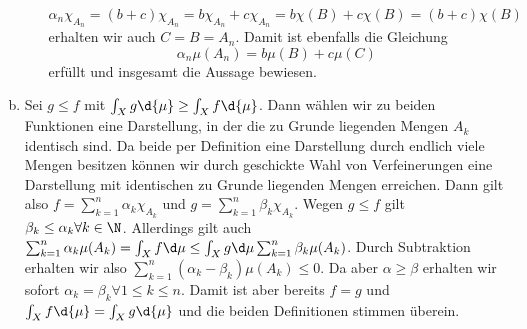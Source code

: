\documentclass{article}
\begin{document}
\begin{enumerate}[(a)]
\begin{enumerate}[1.]
            \[
                \alpha_n\chi_{A_n} = (b + c) \chi_{A_n} = b \chi_{A_n} + c \chi_{A_n} = b \chi(B) + c \chi(B) = (b + c) \chi(B)
            \]
            erhalten wir auch $C = B = A_n$. Damit ist ebenfalls die Gleichung
            \[
                \alpha_n \mu(A_n) = b\mu(B) + c\mu(C)  
            \]
            erfüllt und insgesamt die Aussage bewiesen.
        \end{enumerate}
        \item Sei $g \leq f$ mit $\int_X g \d{\mu} \geq \int_X f \d{\mu}$. Dann wählen wir zu beiden Funktionen eine Darstellung, in der die zu Grunde liegenden Mengen $A_k$ identisch sind. Da beide per Definition eine Darstellung durch endlich viele Mengen besitzen können wir durch geschickte Wahl von Verfeinerungen eine Darstellung mit identischen zu Grunde liegenden Mengen erreichen. Dann gilt also $f = \sum_{k = 1}^{n} \alpha_k \chi_{A_k}$ und $g = \sum_{k = 1}^{n} \beta_k \chi_{A_k}$. Wegen $g \leq f$ gilt $\beta_k \leq \alpha_k \forall k \in \N$. Allerdings gilt auch $\sum_{k = 1}^{n} \alpha_k \mu(A_k) = \int_X f \d \mu \leq \int_X g \d \mu \sum_{k = 1}^{n} \beta_k \mu(A_k)$. Durch Subtraktion erhalten wir also $\sum_{k = 1}^{n} (\alpha_k - \beta_k) \mu(A_k) \leq 0$. Da aber $\alpha \geq \beta$ erhalten wir sofort $\alpha_k = \beta_k \forall 1 \leq k \leq n$. Damit ist aber bereits $f = g$ und $\int_X f \d{\mu} = \int_X g \d{\mu}$ und die beiden Definitionen stimmen überein.
    \end{enumerate}
\end{document}
